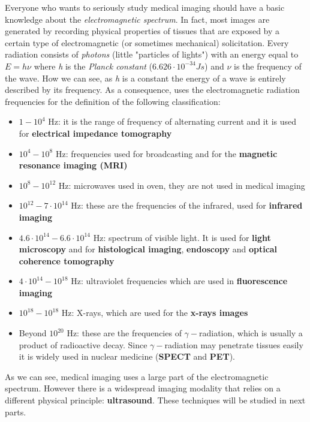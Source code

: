 Everyone who wants to seriously study medical imaging should have a basic knowledge about the \textit{electromagnetic spectrum}. In fact, most images are generated by recording physical properties of tissues that are exposed by a certain type of electromagnetic (or sometimes mechanical) solicitation. Every radiation consists of \textit{photons} (little "particles of lights") with an energy equal to $E = h\nu$ where \textit{h} is the \textit{Planck constant} ($6.626 \cdot 10^{-34} Js$) and $\nu$ is the frequency of the wave. How we can see, as \textit{h} is a constant the energy of a wave is entirely described by its frequency. As a consequence, \cite{Birkfellner} uses the electromagnetic radiation frequencies for the definition of the following classification:
\begin{itemize}
 \item $1-10^{4}$ Hz: it is the range of frequency of alternating current and it is used for \textbf{electrical impedance tomography}
 \item $10^{4}-10^{8}$ Hz: frequencies used for broadcasting and for the \textbf{magnetic resonance imaging (MRI)}
 \item $10^{8}-10^{12}$ Hz: microwaves used in oven, they are not used in medical imaging
 \item $10^{12}-7 \cdot 10^{14}$ Hz: these are the frequencies of the infrared, used for \textbf{infrared imaging}
 \item $4.6 \cdot 10^{14}-6.6 \cdot 10^{14}$ Hz: spectrum of visible light. It is used for \textbf{light microscopy} and for \textbf{histological imaging}, \textbf{endoscopy} and \textbf{optical coherence tomography} 
 \item $4 \cdot 10^{14}-10^{18}$ Hz: ultraviolet frequencies which are used in \textbf{fluorescence imaging}
 \item $10^{18}-10^{18}$ Hz: X-rays, which are used for the \textbf{x-rays images}
 \item Beyond $10^{20}$ Hz: these are the frequencies of $\gamma-$radiation, which is usually a product of radioactive decay. Since $\gamma-$radiation may penetrate tissues easily it is widely used in nuclear medicine (\textbf{SPECT} and \textbf{PET}).
\end{itemize}

As we can see, medical imaging uses a large part of the electromagnetic spectrum. However there is a widespread imaging modality that relies on a different physical principle: \textbf{ultrasound}. These techniques will be studied in next parts.\\


